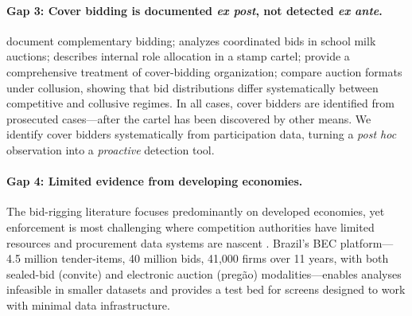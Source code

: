 \paragraph{Gap 3: Cover bidding is documented \emph{ex post}, not
detected \emph{ex ante}.}
\citet{porter1999ohio} document complementary bidding;
\citet{pesendorfer2000study} analyzes coordinated bids in school milk
auctions; \citet{asker2010leniency} describes internal role allocation
in a stamp cartel; \citet{marshall2012economics} provide a
comprehensive treatment of cover-bidding organization;
\citet{athey2011comparing} compare auction formats under collusion,
showing that bid distributions differ systematically between
competitive and collusive regimes. In all cases,
cover bidders are identified from prosecuted cases---after the cartel
has been discovered by other means. We identify cover bidders
systematically from participation data, turning a \emph{post hoc}
observation into a \emph{proactive} detection tool.

\paragraph{Gap 4: Limited evidence from developing economies.}
The bid-rigging literature focuses predominantly on developed
economies, yet enforcement is most challenging where competition
authorities have limited resources and procurement data systems are
nascent \citep{sanchezgraells2019screening}. Brazil's BEC
platform---4.5 million tender-items, 40 million bids, 41,000 firms
over 11 years, with both sealed-bid (convite) and electronic auction
(preg\~ao) modalities---enables analyses infeasible in smaller
datasets and provides a test bed for screens designed to work with
minimal data infrastructure.
